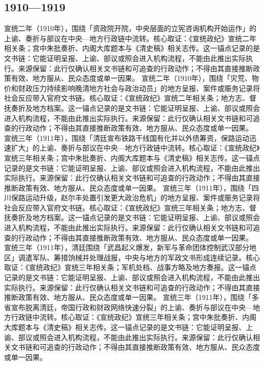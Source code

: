\subsection{1910—1919}
宣统二年（1910年），围绕「资政院开院，中央层面的立宪咨询机构开始运作」的上谕、奏折与部议在中央—地方行政链中流转。核心取证：《宣统政纪》宣统二年相关条；宫中朱批奏折、内阁大库题本与《清史稿》相关志传。这一锚点记录的是文书链：它能证明呈报、上谕、部议或照会进入机构流程，不能由此推出实际执行。来源保留：此行仅确认相关文书链和可追查的行政动作；不得由其直接推断政策有效、地方服从、民众态度或单一因果。
宣统二年（1910年），围绕「灾荒、物价和财政压力持续影响晚清地方社会与政治动员」的地方呈报、案件或赈务记录将社会反应带入官府文书链。核心取证：《宣统政纪》宣统二年相关条；地方志、督抚奏折及地方档案。这一锚点记录的是文书链：它能证明呈报、上谕、部议或照会进入机构流程，不能由此推出实际执行。来源保留：此行仅确认相关文书链和可追查的行政动作；不得由其直接推断政策有效、地方服从、民众态度或单一因果。
宣统三年（1911年），围绕「清廷宣布铁路干线国有化并以外债筹资，保路运动迅速扩大」的上谕、奏折与部议在中央—地方行政链中流转。核心取证：《宣统政纪》宣统三年相关条；宫中朱批奏折、内阁大库题本与《清史稿》相关志传。这一锚点记录的是文书链：它能证明呈报、上谕、部议或照会进入机构流程，不能由此推出实际执行。来源保留：此行仅确认相关文书链和可追查的行政动作；不得由其直接推断政策有效、地方服从、民众态度或单一因果。
宣统三年（1911年），围绕「四川保路运动升级，赵尔丰处置引发更大政治危机」的地方呈报、案件或赈务记录将社会反应带入官府文书链。核心取证：《宣统政纪》宣统三年相关条；地方志、督抚奏折及地方档案。这一锚点记录的是文书链：它能证明呈报、上谕、部议或照会进入机构流程，不能由此推出实际执行。来源保留：此行仅确认相关文书链和可追查的行政动作；不得由其直接推断政策有效、地方服从、民众态度或单一因果。
宣统三年（1911年），清廷围绕「武昌起义爆发，新军与革命团体控制武汉部分地区」调遣军队、筹措饷械并处理战报，中央与地方的军政文书形成连续记录。核心取证：《宣统政纪》宣统三年相关条；军机处档、战事方略及地方奏报。这一锚点记录的是文书链：它能证明呈报、上谕、部议或照会进入机构流程，不能由此推出实际执行。来源保留：此行仅确认相关文书链和可追查的行政动作；不得由其直接推断政策有效、地方服从、民众态度或单一因果。
宣统三年（1911年），围绕「多省宣布脱离清廷，帝国行政和财政网络快速分裂」的上谕、奏折与部议在中央—地方行政链中流转。核心取证：《宣统政纪》宣统三年相关条；宫中朱批奏折、内阁大库题本与《清史稿》相关志传。这一锚点记录的是文书链：它能证明呈报、上谕、部议或照会进入机构流程，不能由此推出实际执行。来源保留：此行仅确认相关文书链和可追查的行政动作；不得由其直接推断政策有效、地方服从、民众态度或单一因果。
